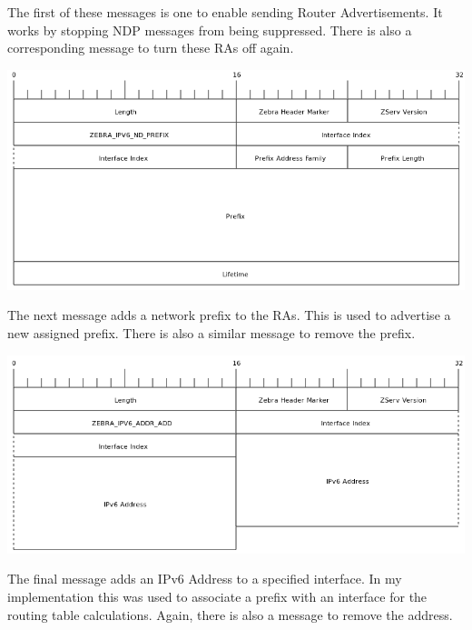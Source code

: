 The first of these messages is one to enable sending Router Advertisements. It
works by stopping NDP messages from being suppressed. There is also a
corresponding message to turn these RAs off again. 

\begin{center}
	\includegraphics[width=0.9\linewidth]{../Diagrams/Packets/ipv6_nd_prefix.png}
\end{center}

The next message adds a network prefix to the RAs. This is used to advertise a
new assigned prefix. There is also a similar message to remove the prefix.


\begin{center}
	\includegraphics[width=0.9\linewidth]{../Diagrams/Packets/addr_add.png}
\end{center}

The final message adds an IPv6 Address to a specified interface. In my
implementation this was used to associate a prefix with an interface for the
routing table calculations. Again, there is also a message to remove the
address.

